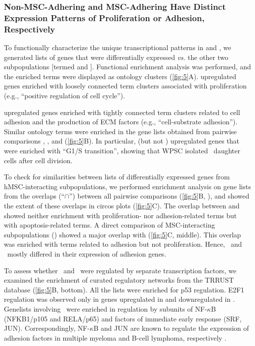 \subsubsection*{Non-MSC-Adhering \INA and MSC-Adhering \INA Have Distinct
    Expression Patterns of Proliferation or Adhesion, Respectively}%
\label{C1:results:RNAseq:subpopulations}%
To functionally characterize the unique transcriptional patterns in \nMAina and
\MAina, we generated lists of genes that were differentially expressed
\textit{vs.} the other two subpopulations [termed  and
        ]. Functional enrichment analysis was performed, and the
enriched terms were displayed as ontology clusters (\autoref{fig:5}A). \nMAina
upregulated genes enriched with loosely connected term clusters associated with
proliferation (e.g., “positive regulation of cell cycle”).



\MAina upregulated genes enriched with tightly connected term clusters related
to cell adhesion and the production of ECM factors (e.g., ``cell-substrate
adhesion''). Similar ontology terms were enriched in the gene lists obtained
from pairwise comparisons , , and
 (\autoref{fig:5}B). In particular,  (but not
) upregulated genes that were enriched with “G1/S transition”,
showing that WPSC isolated \nMAina\ daughter cells after cell division.


To check for similarities between lists of differentially expressed genes from
hMSC-interacting subpopulations, we performed enrichment analysis on gene lists
from the overlaps (“$\cap$”) between all pairwise comparisons (\autoref{fig:5}B,
), and showed the extent of these overlaps in
circos plots (\autoref{fig:5}C). The overlap between  and
 showed neither enrichment with proliferation- nor
adhesion-related terms but with apoptosis-related terms. A direct comparison of
MSC-interacting subpopulations () showed a major overlap with
 (\autoref{fig:5}C, middle). This overlap was enriched with terms
related to adhesion but not proliferation. Hence, \MAina\ and \nMAina\ mostly
differed in their expression of adhesion genes.


To assess whether \nMAina\ and \MAina\ were regulated by separate transcription
factors, we examined the enrichment of curated regulatory networks from the
TRRUST database (\autoref{fig:5}B, bottom). All the lists were enriched for p53
regulation. E2F1 regulation was observed only in genes upregulated in
 and downregulated in . Genelists involving
\MAina\ were enriched in regulation by subunits of NF-$\kappa$B (NFKB1/p105 and
RELA/p65) and factors of immediate early response (SRF, JUN). Correspondingly,
NF-$\kappa$B and JUN are known to regulate the expression of adhesion factors in
multiple myeloma and B-cell lymphoma, respectively
\cite{blonskaJunregulatedGenesPromote2015,taiRoleBcellactivatingFactor2006}.

